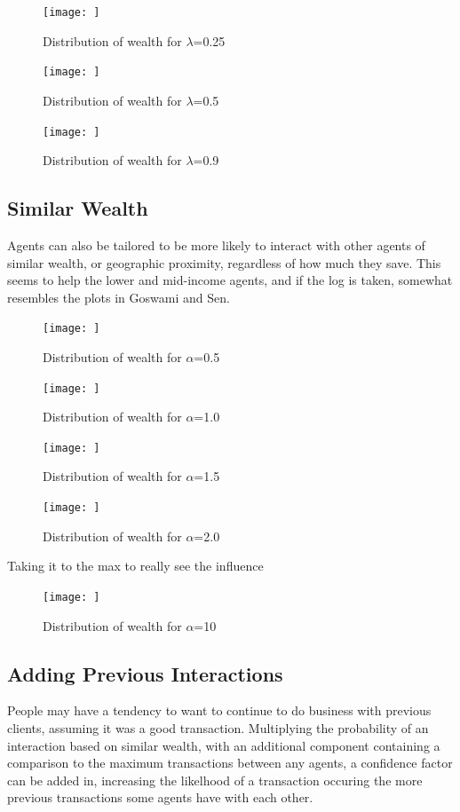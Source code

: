 \documentclass[12pt]{article} %
\begin{document}
\begin{figure}
	\texttt{[image: ]}
	\caption{Distribution of wealth for $\lambda$=0.25}
	\label{}
\end{figure}


\begin{figure}
	\texttt{[image: ]}
	\caption{Distribution of wealth for $\lambda$=0.5}
	\label{}
\end{figure}
\begin{figure}
	\texttt{[image: ]}
	\caption{Distribution of wealth for $\lambda$=0.9}
	\label{}
\end{figure}

\subsection{Similar Wealth}
Agents can also be tailored to be more likely to interact with other agents of
similar wealth, or geographic proximity, regardless of how much they save. This seems to help the lower and
mid-income agents, and if the log is taken, somewhat resembles the plots in
Goswami and Sen\cite{Goswami}.

\begin{figure}
	\texttt{[image: ]}
	\caption{Distribution of wealth for $\alpha$=0.5}
	\label{}
\end{figure}

\begin{figure}
	\texttt{[image: ]}
	\caption{Distribution of wealth for $\alpha$=1.0}
	\label{}
\end{figure}
\begin{figure}
	\texttt{[image: ]}
	\caption{Distribution of wealth for $\alpha$=1.5}
	\label{}
\end{figure}
\begin{figure}
	\texttt{[image: ]}
	\caption{Distribution of wealth for $\alpha$=2.0}
	\label{}
\end{figure}

Taking it to the max to really see the influence

\begin{figure}
	\texttt{[image: ]}
	\caption{Distribution of wealth for $\alpha$=10}
	\label{}
\end{figure}

\subsection{Adding Previous Interactions}
People may have a tendency to want to continue to do business with previous
clients, assuming it was a good transaction. Multiplying the probability of an
interaction based on similar wealth, with an additional component containing a
comparison to the maximum transactions between any agents, a confidence factor
can be added in, increasing the likelhood of a transaction occuring the more
previous transactions some agents have with each other.
\end{document}
